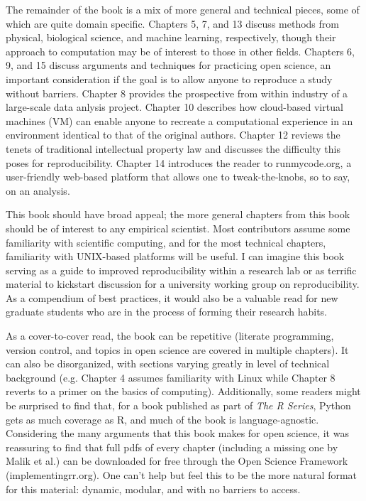 \documentclass[12pt]{article}
\begin{document}
The remainder of the book is a mix of more general and technical pieces,
some of which are quite domain specific.  Chapters 5, 7, and 13 discuss methods
from physical, biological science, and machine learning, respectively, though
their approach to computation may be of interest to those in other fields. Chapters 
6, 9, and 15 discuss arguments and techniques for practicing open science, an
important consideration if the goal is to allow anyone to reproduce a study
without barriers.  Chapter 8 provides the prospective from within industry of a 
large-scale data anlysis project. Chapter 10 describes how cloud-based virtual 
machines (VM) can enable anyone to recreate a computational experience in an 
environment identical to that of the original authors. Chapter 12 reviews the
tenets of traditional intellectual property law and discusses the difficulty
 this poses for reproducibility. Chapter 14 introduces the reader to runmycode.org,
a user-friendly web-based platform that allows one to tweak-the-knobs, so to say,
on an analysis.

This book should have broad appeal; the more general chapters 
from this book should be of interest to any empirical scientist. Most contributors
assume some familiarity with scientific computing, and for the most technical 
chapters, familiarity with UNIX-based platforms will be useful. I can imagine this book serving as
a guide to improved reproducibility within a research lab or as terrific  
material to kickstart discussion for a university working group on reproducibility.  As a
compendium of best practices, it would also be a valuable read for new graduate
students who are in the process of forming their research habits.

As a cover-to-cover read, the book can be repetitive (literate programming, version
control, and topics in open science are covered in multiple chapters).  It can also be
disorganized, with sections varying greatly in level of technical background
(e.g. Chapter 4 assumes familiarity with Linux while Chapter 8 reverts to a primer on
the basics of computing). Additionally, some readers might be 
surprised to find that, for a book published as part of \emph{The R Series}, 
Python gets as much coverage as R, and much of the book is language-agnostic.
Considering the many arguments that this book makes for open science, it was
reassuring to find that full pdfs of every chapter (including a missing one by 
Malik et al.) can be downloaded for free through the Open Science Framework 
(implementingrr.org). One can't help but feel this to be the more natural format
 for this material: dynamic, modular, and with no barriers to access.
\end{document}
